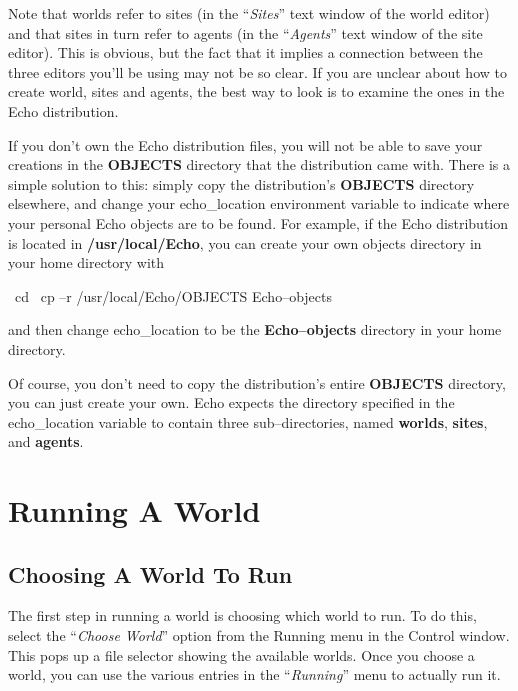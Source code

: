 Note that worlds refer to sites (in the ``{\sl Sites}'' text window of
the world editor) and that sites in turn refer to agents (in the
``{\sl Agents}'' text window of the site editor). This is obvious, but
the fact that it implies a connection between the three editors you'll
be using may not be so clear. If you are unclear about how to create
world, sites and agents, the best way to look is to examine the ones
in the Echo distribution.

If you don't own the Echo distribution files, you will not be able to
save your creations in the {\bf OBJECTS} directory that the
distribution came with.  There is a simple
solution to this: simply copy the distribution's {\bf OBJECTS}
directory elsewhere, and change your {\sc echo\_location} environment
variable to indicate where your personal Echo objects are to be
found. For example, if the Echo distribution is located in {\bf
/usr/local/Echo}, you can create your own objects directory in your
home directory with

\begin{shell}
\prompt\ cd
\prompt\ cp --r /usr/local/Echo/OBJECTS Echo--objects
\end{shell}

and then change {\sc echo\_location} to be the {\bf Echo--objects}
directory in your home directory.

Of course, you don't need to copy the distribution's entire
{\bf OBJECTS} directory, you can just create your own. Echo expects
the directory specified in the {\sc echo\_location} variable to
contain three sub--directories, named {\bf worlds}, {\bf sites}, and
{\bf agents}.

\section{Running A World}

\subsection{Choosing A World To Run}

The first step in running a world is choosing which world to run.  To
do this, select the ``{\sl Choose World}'' option from the Running
menu in the Control window. This pops up a file selector showing the
available worlds. Once you choose a world, you can use the various
entries in the ``{\sl Running}'' menu to actually run it.

